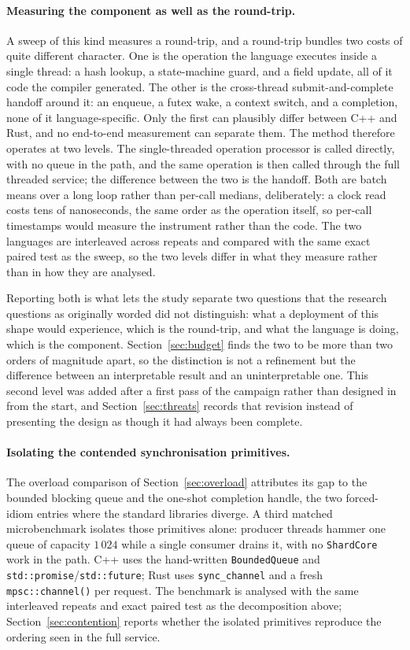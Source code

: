 \documentclass[english,twoside,openright,a4paper,censored,csm,software-track-2020]{HYthesisML}
\begin{document}
\paragraph{Measuring the component as well as the round-trip.}
A sweep of this kind measures a round-trip, and a round-trip bundles two costs of quite
different character. One is the operation the language executes inside a single thread: a hash
lookup, a state-machine guard, and a field update, all of it code the compiler generated. The
other is the cross-thread submit-and-complete handoff around it: an enqueue, a futex wake, a
context switch, and a completion, none of it language-specific. Only the first can plausibly
differ between C++ and Rust, and no end-to-end measurement can separate them. The method
therefore operates at two levels. The single-threaded operation processor is called directly,
with no queue in the path, and the same operation is then called through the full threaded
service; the difference between the two is the handoff. Both are batch means over a long loop
rather than per-call medians, deliberately: a clock read costs tens of nanoseconds, the same
order as the operation itself, so per-call timestamps would measure the instrument rather than
the code. The two languages are interleaved across repeats and compared with the same exact
paired test as the sweep, so the two levels differ in what they measure rather than in how they
are analysed.

Reporting both is what lets the study separate two questions that the research questions as
originally worded did not distinguish: what a deployment of this shape would experience, which
is the round-trip, and what the language is doing, which is the component.
Section~\ref{sec:budget} finds the two to be more than two orders of magnitude apart, so the
distinction is not a refinement but the difference between an interpretable result and an
uninterpretable one. This second level was added after a first pass of the campaign rather than
designed in from the start, and Section~\ref{sec:threats} records that revision instead of
presenting the design as though it had always been complete.

\paragraph{Isolating the contended synchronisation primitives.}
The overload comparison of Section~\ref{sec:overload} attributes its gap to the bounded blocking
queue and the one-shot completion handle, the two forced-idiom entries where the standard libraries
diverge. A third matched microbenchmark isolates those primitives alone: \ContentionProducers{}
producer threads hammer one queue of capacity $1\,024$ while a single consumer drains it, with no
\texttt{ShardCore} work in the path. C++ uses the hand-written \texttt{BoundedQueue} and
\texttt{std::promise}/\texttt{std::future}; Rust uses \texttt{sync\_channel} and a fresh
\texttt{mpsc::channel()} per request. The benchmark is analysed with the same interleaved repeats
and exact paired test as the decomposition above; Section~\ref{sec:contention} reports whether
the isolated primitives reproduce the ordering seen in the full service.
\end{document}
